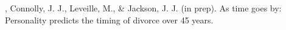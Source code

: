 \item\meb, Connolly, J. J., Leveille, M., \& Jackson, J. J. (in prep). As time goes by: Personality predicts the timing of divorce over 45 years. %
\vspace{-2mm}\begin{center}\end{center} \vspace{-4mm}